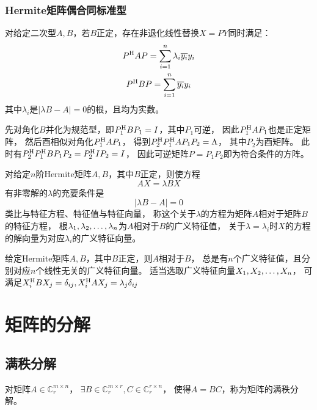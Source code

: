 \subsubsection{Hermite矩阵偶合同标准型}

\begin{theorem}
    对给定二次型$A,B$，若$B$正定，存在非退化线性替换$X=PY$同时满足：
    \begin{gather*}
        P^\mathrm{H} AP = \sum_{i=1}^n \lambda_i \overline{y_i} y_i \\
        P^\mathrm{H} BP = \sum_{i=1}^n \overline{y_i} y_i
    \end{gather*}
    其中$\lambda_i$是$|\lambda B-A|=0$的根，且均为实数。
\end{theorem}

先对角化$B$并化为规范型，即$P_1^\mathrm{H} BP_1=I$，其中$P_1$可逆，
因此$P_1^\mathrm{H} AP_1$也是正定矩阵，
然后酉相似对角化$P_1^\mathrm{H} AP_1$，
得到$P_2^\mathrm{H} P_1^\mathrm{H} A P_1 P_2=\Lambda$，
其中$P_2$为酉矩阵。
此时有$P_2^\mathrm{H} P_1^\mathrm{H} B P_1 P_2 = P_2^\mathrm{H} I P_2 = I$，
因此可逆矩阵$P=P_1 P_2$即为符合条件的方阵。

\begin{definition}
    对给定$n$阶Hermite矩阵$A,B$，其中$B$正定，则使方程
    \[
        AX=\lambda BX
    \]
    有非零解的$\lambda$的充要条件是
    \[
        |\lambda B-A|=0
    \]
    类比与特征方程、特征值与特征向量，
    称这个关于$\lambda$的方程为矩阵$A$相对于矩阵$B$的特征方程，
    根$\VectorComma{\lambda}{n}$为$A$相对于$B$的广义特征值，
    关于$\lambda=\lambda_i$时$X$的方程的解向量为对应$\lambda_i$的广义特征向量。
\end{definition}

\begin{property}
    给定Hermite矩阵$A,B$，其中$B$正定，则$A$相对于$B$，
    总是有$n$个广义特征值，且分别对应$n$个线性无关的广义特征向量。
    适当选取广义特征向量$\VectorComma{X}{n}$，
    可满足$X_i^\mathrm{H} B X_j=\delta_{ij},X_i^\mathrm{H} A X_j = \lambda_j\delta_{ij}$
\end{property}

\section{矩阵的分解}
\subsection{满秩分解}

\begin{definition}[满秩分解]
    对矩阵$A\in \mathbb{C}^{m\times n}_r$，
    $\exists B\in \mathbb{C}^{m\times r}_r, C\in \mathbb{C}^{r\times n}_r$，
    使得$A=BC$，称为矩阵的满秩分解。
\end{definition}

